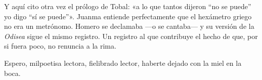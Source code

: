 \documentclass[11pt,a4paper]{article}
\begin{document}
Y aquí cito otra vez el prólogo de Tobal: «a lo que tantos dijeron “no se puede” yo digo “sí se puede”». Juanma entiende perfectamente que el hexámetro griego no era un metrónomo. Homero se declamaba ---o se cantaba--- y su versión de la \emph{Odisea} sigue el mismo registro. Un registro al que contribuye el hecho de que, por si fuera poco, no renuncia a la rima. 

Espero, milpoetisa lectora, fielibrado lector, haberte dejado con la miel en la boca. 

\end{document}
